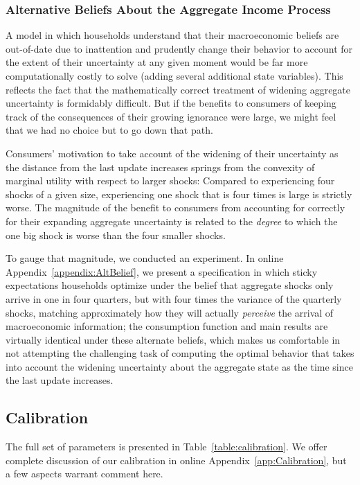 \documentclass[titlepage]{\econtex}
\begin{document}
\hypertarget{AltBeliefs}{}
\subsubsection{Alternative Beliefs About the Aggregate Income Process}
A model in which households understand that their macroeconomic beliefs are out-of-date due to inattention and prudently change their behavior to account for the extent of their uncertainty at any given moment would be far more computationally costly to solve (adding several additional state variables).  This reflects the fact that the mathematically correct treatment of widening aggregate uncertainty is formidably difficult.  But if the benefits to consumers of keeping track of the consequences of their growing ignorance were large, we might feel that we had no choice but to go down that path.

Consumers' motivation to take account of the widening of their uncertainty as the distance from the last update increases springs from the convexity of marginal utility with respect to larger shocks: Compared to experiencing four shocks of a given size, experiencing one shock that is four times is large is strictly worse.  The magnitude of the benefit to consumers from accounting for correctly for their expanding aggregate uncertainty is related to the \textit{degree} to which the one big shock is worse than the four smaller shocks.

To gauge that magnitude, we conducted an experiment.  In online Appendix~\ref{appendix:AltBelief}, we present a specification in which sticky expectations households optimize under the belief that aggregate shocks only arrive in one in four quarters, but with four times the variance of the quarterly shocks, matching approximately how they will actually \textit{perceive} the arrival of macroeconomic information; the consumption function and main results are virtually identical under these alternate beliefs, which makes us comfortable in not attempting the challenging task of computing the optimal behavior that takes into account the widening uncertainty about the aggregate state as the time since the last update increases.

\subsection{Calibration}\label{sec:calibration}

The full set of parameters is presented in Table~\ref{table:calibration}.  We offer complete discussion of our calibration in online Appendix~\ref{app:Calibration}, but a few aspects warrant comment here.
\end{document}
